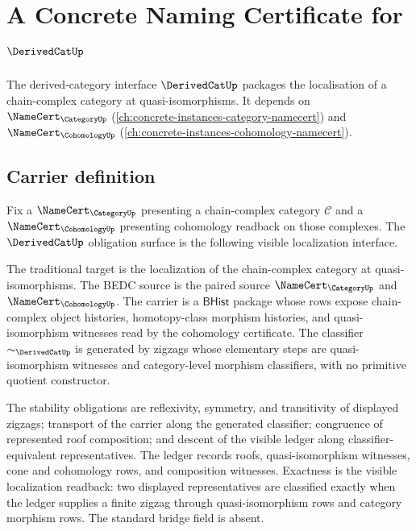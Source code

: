 \chapter{A Concrete Naming Certificate for $\DerivedCatUp$}
\label{ch:concrete-instances-derivedcat-namecert}

The derived-category interface $\DerivedCatUp$ packages the localisation of a chain-complex category at quasi-isomorphisms. It depends on $\NameCert_{\CategoryUp}$ (\autoref{ch:concrete-instances-category-namecert}) and $\NameCert_{\CohomologyUp}$ (\autoref{ch:concrete-instances-cohomology-namecert}).

\section{Carrier definition}
\label{sec:derivedcat-carrier}

\begin{definition}
\label{def:derivedcat-namecert-obligation-surface}
Fix a $\NameCert_{\CategoryUp}$ presenting a chain-complex category $\mathcal{C}$ and a $\NameCert_{\CohomologyUp}$ presenting cohomology readback on those complexes. The $\DerivedCatUp$ obligation surface is the following visible localization interface.

The traditional target is the localization of the chain-complex category at quasi-isomorphisms. The BEDC source is the paired source $\NameCert_{\CategoryUp}$ and $\NameCert_{\CohomologyUp}$. The carrier is a $\mathsf{BHist}$ package whose rows expose chain-complex object histories, homotopy-class morphism histories, and quasi-isomorphism witnesses read by the cohomology certificate. The classifier $\sim_{\DerivedCatUp}$ is generated by zigzags whose elementary steps are quasi-isomorphism witnesses and category-level morphism classifiers, with no primitive quotient constructor.

The stability obligations are reflexivity, symmetry, and transitivity of displayed zigzags; transport of the carrier along the generated classifier; congruence of represented roof composition; and descent of the visible ledger along classifier-equivalent representatives. The ledger records roofs, quasi-isomorphism witnesses, cone and cohomology rows, and composition witnesses. Exactness is the visible localization readback: two displayed representatives are classified exactly when the ledger supplies a finite zigzag through quasi-isomorphism rows and category morphism rows. The standard bridge field is absent.
\end{definition}

